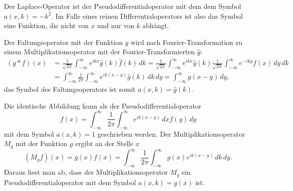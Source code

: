 \begin{beispiel}
Der Laplace-Operator ist der Pseudodifferentialoperator mit dem
dem Symbol
\(
a(x,k)=
-k^2
\).
Im Falle eines reinen Differentialoperators ist also das Symbol eine 
Funktion, die nicht von $x$ und nur von $k$ abhängt.
\end{beispiel}

\begin{beispiel}
Der Faltungsoperator mit der Funktion $g$ wird nach Fourier-Transformation
zu einem Multiplikationsoperator mit der Fourier-Transformierten $\hat{g}$:
\begin{align*}
(g * f)(x)
&=
\frac{1}{\!\sqrt{2\pi}}
\int_{-\infty}^\infty e^{ikx} \hat{g}(k) \hat{f}(k) \,dk
=
\frac{1}{\!\sqrt{2\pi}}
\int_{-\infty}^\infty
e^{ikx}
\hat{g}(k) 
\frac{1}{\!\sqrt{2\pi}}
\int_{-\infty}^\infty
e^{-iky}
f(x)
\,dy
\,dk
\\
&=
\int_{-\infty}^\infty
\frac{1}{2\pi}
\int_{-\infty}^\infty
e^{ik(x-y)}
\hat{g}(k)
\,dk
\,dy
=
\int_{-\infty}^\infty
g(x-y)
\,dy,
\end{align*}
das Symbol des Faltungsoperators ist somit $a(x,k)=\hat{g}(k)$.
\end{beispiel}

\begin{beispiel}
Die identische Abbildung kann als der Pseudodifferentialoperator
\[
f(x)
=
\int_{-\infty}^\infty 
\frac{1}{2\pi}
\int_{-\infty}^\infty 
e^{ik(x-y)}
\,dx
f(y)
\,dy
\]
mit dem Symbol $a(x,k)=1$ geschrieben werden.
Der Multiplikationsoperator $M_g$ mit der Funktion $g$ ergibt an
der Stelle $x$
\[
(M_gf)(x)
=
g(x) f(x)
=
\int_{-\infty}^\infty
\frac{1}{2\pi}
\int_{-\infty}^\infty
g(x) e^{ik(x-y)}
\,dk
\,dy.
\]
Daraus liest man ab, dass der Multiplikationsoperator $M_g$ ein
Pseudodifferentialoperator mit dem Symbol $a(x,k)=g(x)$ ist.
\end{beispiel}




